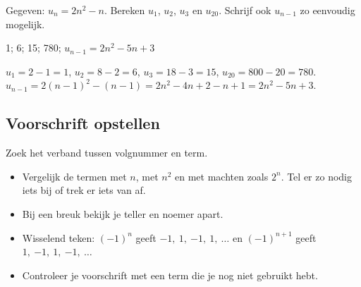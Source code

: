 

\begin{oefeningen}
\begin{oefening}
Gegeven: $u_n = 2n^2 - n$. Bereken $u_1$, $u_2$, $u_3$ en $u_{20}$. Schrijf ook $u_{n-1}$ zo eenvoudig mogelijk.
\begin{solution}
1; 6; 15; 780; $u_{n-1}=2n^2-5n+3$
\end{solution}
\begin{fullsolution}
$u_1=2-1=1$, $u_2=8-2=6$, $u_3=18-3=15$, $u_{20}=800-20=780$.\\
$u_{n-1}=2(n-1)^2-(n-1)=2n^2-4n+2-n+1=2n^2-5n+3$.
\end{fullsolution}
\end{oefening}
\end{oefeningen}

\subsection{Voorschrift opstellen}

\begin{werkwijze}
Zoek het verband tussen volgnummer en term.
\begin{itemize}
  \item Vergelijk de termen met $n$, met $n^2$ en met machten zoals $2^n$. Tel er zo nodig iets bij of trek er iets van af.
  \item Bij een breuk bekijk je teller en noemer apart.
  \item Wisselend teken: $(-1)^n$ geeft $-1,\ 1,\ {-1},\ 1,\ \ldots$ en $(-1)^{n+1}$ geeft $1,\ {-1},\ 1,\ {-1},\ \ldots$
  \item Controleer je voorschrift met een term die je nog niet gebruikt hebt.
\end{itemize}
\end{werkwijze}


